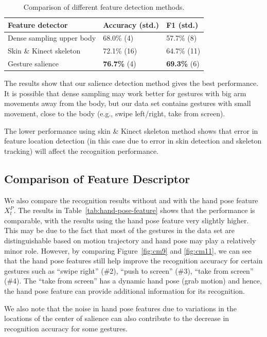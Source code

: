 \documentclass{sigchi}
\newcommand\tabhead[1]{\small\textbf{#1}}
\begin{document}
\begin{table}
\centering
\begin{tabular}{|l|l|l|}
\hline
\tabhead{Feature detector} & {\tabhead{Accuracy (std.)}} & {\tabhead{F1 (std.)}}\\
\hline
Dense sampling upper body & 68.0\% (4) & 57.7\% (8)\\
\hline
Skin \& Kinect skeleton & 72.1\% (16) & 64.7\% (11) \\
\hline
Gesture salience & \textbf{76.7\%} (4) & \textbf{69.3\%} (6) \\
\hline
\end{tabular}
\caption{Comparison of different feature detection methods.}
\label{tab:feature-detection}
\end{table}

The results show that our salience detection method gives the best performance.
It is possible that dense sampling may work better for gestures with big arm
movements away from the body, but our data set contains gestures with
small movement, close to the body (e.g., swipe left/right, take from screen).

The lower performance using skin \& Kinect skeleton method shows that error
in feature location detection (in this case due to error in skin detection and
skeleton tracking) will affect the recognition performance.

\subsection{Comparison of Feature Descriptor}
We also compare the recognition results without and with the hand pose feature
$X_t^P$. The results in Table~\ref{tab:hand-pose-feature} shows that the
performance is comparable, with the results using the hand pose feature very
slightly higher. This may be due to the fact that most of the gestures in the
data set are distinguishable based on motion trajectory and hand pose may play a relatively minor role. However, by comparing
Figure~\ref{fig:cm9} and \ref{fig:cm11}, we can see that the hand pose features
still help improve the recognition accuracy for certain gestures such as ``swipe right'' (\#2), ``push to screen'' (\#3), ``take from screen'' (\#4).
The ``take from screen'' has a dynamic hand pose (grab motion) and hence, the hand
pose feature can provide additional information for its recognition.

We also note that the noise in hand pose features due to variations in the
locations of the center of salience can also contribute to the decrease in
recognition accuracy for some gestures.
\end{document}
